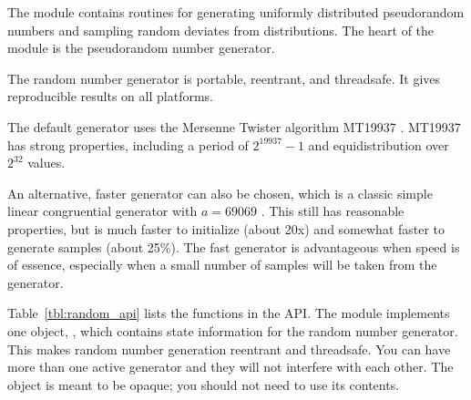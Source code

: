 The  module contains routines for generating uniformly
distributed pseudorandom numbers and sampling random deviates from
distributions. The heart of the module is the 
pseudorandom number generator.

The  random number generator is portable,
reentrant, and threadsafe. It gives reproducible results on all
platforms.

The default  generator uses the Mersenne Twister
algorithm MT19937 \citep{Matsumoto98}. MT19937 has strong properties,
including a period of $2^{19937}-1$ and equidistribution over $2^{32}$
values.

An alternative, faster generator can also be chosen, which is a
classic simple linear congruential generator with $a=69069$
\citep{Knu-81a}. This still has reasonable properties, but is much
faster to initialize (about 20x) and somewhat faster to generate
samples (about 25\%). The fast generator is advantageous when speed is
of essence, especially when a small number of samples will be taken
from the generator.


Table~\ref{tbl:random_api} lists the functions in the 
API. The module implements one object, , which
contains state information for the random number generator.  This
makes random number generation reentrant and threadsafe. You can have
more than one active generator and they will not interfere with each
other. The object is meant to be opaque; you should not need to use
its contents.  


